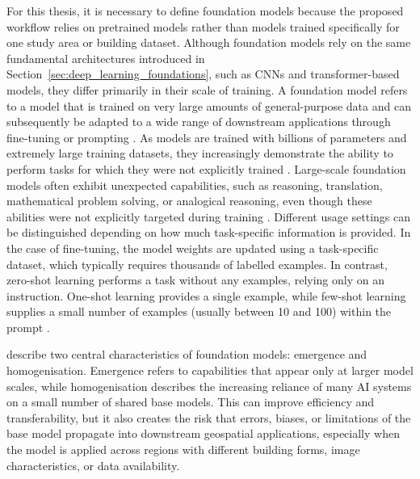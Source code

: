 For this thesis, it is necessary to define foundation models because the proposed workflow relies on pretrained models rather than models trained specifically for one study area or building dataset. Although foundation models rely on the same fundamental architectures introduced in Section~\ref{sec:deep_learning_foundations}, such as CNNs and transformer-based models, they differ primarily in their scale of training. A foundation model refers to a model that is trained on very large amounts of general-purpose data and can subsequently be adapted to a wide range of downstream applications through fine-tuning or prompting \citep{bommasani2022opportunitiesrisksfoundationmodels, Schneider2024}. As models are trained with billions of parameters and extremely large training datasets, they increasingly demonstrate the ability to perform tasks for which they were not explicitly trained \citep{Brown2020FoundationModelFewShot, bommasani2022opportunitiesrisksfoundationmodels}.
Large-scale foundation models often exhibit unexpected capabilities, such as reasoning, translation, mathematical problem solving, or analogical reasoning, even though these abilities were not explicitly targeted during training \citep{Brown2020FoundationModelFewShot}. Different usage settings can be distinguished depending on how much task-specific information is provided. In the case of fine-tuning, the model weights are updated using a task-specific dataset, which typically requires thousands of labelled examples. In contrast, zero-shot learning performs a task without any examples, relying only on an instruction. One-shot learning provides a single example, while few-shot learning supplies a small number of examples (usually between 10 and 100) within the prompt \citep{Brown2020FoundationModelFewShot}.

\citet{bommasani2022opportunitiesrisksfoundationmodels} describe two central characteristics of foundation models: emergence and homogenisation. Emergence refers to capabilities that appear only at larger model scales, while homogenisation describes the increasing reliance of many AI systems on a small number of shared base models. This can improve efficiency and transferability, but it also creates the risk that errors, biases, or limitations of the base model propagate into downstream geospatial applications, especially when the model is applied across regions with different building forms, image characteristics, or data availability.

